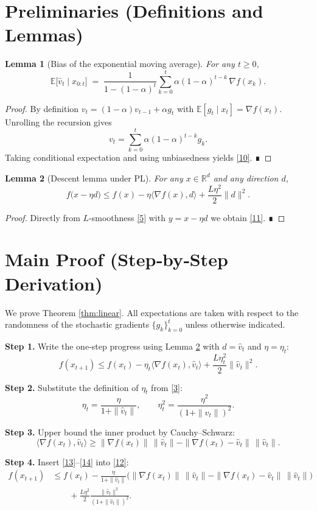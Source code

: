 \documentclass{article}
\newtheorem{lemma}{Lemma}
\newcommand{\EE}{\mathbb{E}}
\begin{document}
\newpage
\section*{Preliminaries (Definitions and Lemmas)}
\begin{lemma}[Bias of the exponential moving average]\label{lem:bias}
For any $t\ge0$,
\[
\EE\!\bigl[\hat v_t\mid x_{0:t}\bigr]
\;=\;
\frac{1}{1-(1-\alpha)^t}
\sum_{k=0}^{t}\alpha(1-\alpha)^{t-k}\,\nabla f(x_k).
\tag{10}
\]
\end{lemma}
\begin{proof}
By definition $v_t=(1-\alpha)v_{t-1}+\alpha g_t$ with $\EE[g_t\mid x_t]=\nabla f(x_t)$.  
Unrolling the recursion gives
\[
v_t=\sum_{k=0}^{t}\alpha(1-\alpha)^{t-k}g_k .
\]
Taking conditional expectation and using unbiasedness yields \eqref{10}. ∎
\end{proof}
\begin{lemma}[Descent lemma under PL]\label{lem:descent}
For any $x\in\mathbb{R}^d$ and any direction $d$,
\[
f\bigl(x-\eta d\bigr)\le f(x)-\eta\langle\nabla f(x),d\rangle+\frac{L\eta^2}{2}\|d\|^2 .
\tag{11}
\]
\end{lemma}
\begin{proof}
Directly from $L$‑smoothness \eqref{5} with $y=x-\eta d$ we obtain \eqref{11}. ∎
\end{proof}

\section*{Main Proof (Step‑by‑Step Derivation)}
We prove Theorem \ref{thm:linear}.  
All expectations are taken with respect to the randomness of the stochastic gradients $\{g_k\}_{k=0}^{t}$ unless otherwise indicated.

\noindent\textbf{Step 1.}  Write the one‑step progress using Lemma \ref{lem:descent} with $d=\hat v_t$ and $\eta=\eta_t$:
\[
f(x_{t+1})\le f(x_t)-\eta_t\langle\nabla f(x_t),\hat v_t\rangle
+\frac{L\eta_t^2}{2}\|\hat v_t\|^2 .
\tag{12}
\]

\noindent\textbf{Step 2.}  Substitute the definition of $\eta_t$ from \eqref{3}:
\[
\eta_t=\frac{\eta}{1+\|\hat v_t\|},\qquad
\eta_t^2=\frac{\eta^2}{(1+\|\hat v_t\|)^2}.
\tag{13}
\]

\noindent\textbf{Step 3.}  Upper bound the inner product by Cauchy–Schwarz:
\[
\langle\nabla f(x_t),\hat v_t\rangle
\ge \|\nabla f(x_t)\|\,\|\hat v_t\|-\|\nabla f(x_t)-\hat v_t\|\,\|\hat v_t\| .
\tag{14}
\]

\noindent\textbf{Step 4.}  Insert \eqref{13}–\eqref{14} into \eqref{12}:
\[
\begin{aligned}
f(x_{t+1})
&\le f(x_t)
-\frac{\eta}{1+\|\hat v_t\|}\bigl(\|\nabla f(x_t)\|\,\|\hat v_t\|
      -\|\nabla f(x_t)-\hat v_t\|\,\|\hat v_t\|\bigr)   \\
&\qquad
+\frac{L\eta^2}{2}\frac{\|\hat v_t\|^2}{(1+\|\hat v_t\|)^2}.
\end{aligned}
\tag{15}
\]
\end{document}
